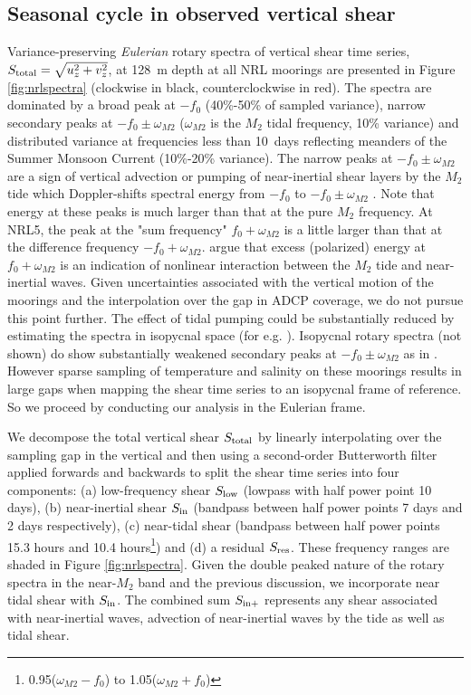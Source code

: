 \documentclass[twocol]{ametsoc}
\begin{document}
\subsection{Seasonal cycle in observed vertical shear}
\label{sec:org9bf010f}

Variance-preserving \emph{Eulerian} rotary spectra of vertical shear time series, \(S_\text{total} = \sqrt{u_z^2 + v_z^2}\), at \SI{128}{m} depth at all NRL moorings are presented in Figure \ref{fig:nrlspectra} (clockwise in black, counterclockwise in red).
The spectra are dominated by a broad peak at \(-f_0\) (40\%-50\% of sampled variance), narrow secondary peaks at \(-f_0 \pm ω_{M2}\) (\(ω_{M2}\) is the \(M_2\) tidal frequency, 10\% variance) and distributed variance at frequencies less than \SI{10}{days} reflecting meanders of the Summer Monsoon Current (10\%-20\% variance).
The narrow peaks at \(-f_0 \pm ω_{M2}\) are a sign of vertical advection or pumping of near-inertial shear layers by the \(M_2\) tide which Doppler-shifts spectral energy from \(-f_0\) to \(-f_0 \pm ω_{M2}\) \citep{Alford2001a}.
Note that energy at these peaks is much larger than that at the pure \(M_2\) frequency.
At NRL5, the peak at the "sum frequency" \(f_0 + ω_{M2}\) is a little larger than that at the difference frequency \(-f_0 + ω_{M2}\).
\cite{Mihaly1998} argue that excess (polarized) energy at \(f_0 + ω_{M2}\) is an indication of nonlinear interaction between the \(M_2\) tide and near-inertial waves.
Given uncertainties associated with the vertical motion of the moorings and the interpolation over the gap in ADCP coverage, we do not pursue this point further.
The effect of tidal pumping could be substantially reduced by estimating the spectra in isopycnal space (for e.g. \citealp{Alford2017}).
Isopycnal rotary spectra (not shown) do show substantially weakened secondary peaks at \(-f_0 \pm ω_{M2}\) as in \cite{Alford2001a}.
However sparse sampling of temperature and salinity on these moorings results in large gaps when mapping the shear time series to an isopycnal frame of reference.
So we proceed by conducting our analysis in the Eulerian frame.

We decompose the total vertical shear \(S_\text{total}\) by linearly interpolating over the sampling gap in the vertical and then using a second-order Butterworth filter applied forwards and backwards to split the shear time series into four components: (a) low-frequency shear \(S_\text{low}\) (lowpass with half power point 10 days), (b) near-inertial shear  \(S_\text{in}\) (bandpass between half power points 7 days and 2 days respectively), (c) near-tidal shear (bandpass between half power points 15.3 hours and 10.4 hours\footnote{0.95(\(ω_{M2} - f_0\)) to 1.05(\(ω_{M2} + f_0\))}) and (d) a residual \(S_\text{res}\).
These frequency ranges are shaded in Figure \ref{fig:nrlspectra}.
Given the double peaked nature of the rotary spectra in the near-\(M_2\) band and the previous discussion, we incorporate near tidal shear with \(S_\text{in}\).
The combined sum \(S_\text{in+}\) represents any shear associated with near-inertial waves, advection of near-inertial waves by the tide as well as tidal shear.
\end{document}
